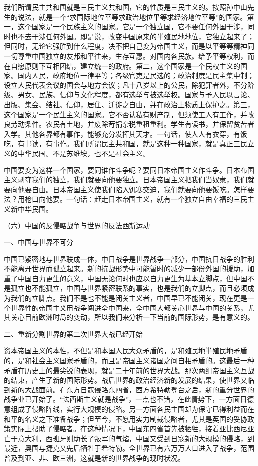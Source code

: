 我们所谓民主共和国就是三民主义共和国，它的性质是三民主义的。按照孙中山先生的说法，就是一个“求国际地位平等求政治地位平等求经济地位平等”的国家。第一，这个国家是一个民族主义的国家。它是一个独立国，它不要任何外国干涉，同时也不去干涉任何外国。即是说，改变中国原来的半殖民地地位，它独立起来了；但同时，无论它强胜到什么程度，决不把自己变为帝国主义，而是以平等等精神同一切尊重中国独立的友邦和平往来，生存互惠。对国内各民族。给予平等权利，而在自愿原则下互相团结，建立统一的政府。第二，这个国家是一个民权主义的国家。国内人民，政府地位一律平等；各级官吏是民选的；政治制度是民主集中制；设立人民代表会议的国会与地方会议；凡十八岁以上的公民，除犯罪者外，不分阶级、男女、民族、信仰与文化程度，都有选举与被选举权。国家与予人民以言论、出版、集会、结社、信仰，居住、迁徙之自由，并在政治上物质上保护之。第三，这个国家是一个民生主义的国家。它不否认私有财产制，但须使工人有工作，并改良劳动条件。农民有土地，并废除苛捐杂税重租重利。学生有读书，并保留贫苦者入学。其他各界都有事作，能够充分发挥其天才。一句话，使人人有衣穿，有饭吃，有书读，有事作。我们所谓民主共和国，就是这种一种国家，就是真正三民立义的中华民国。不是苏维埃，也不是社会主义。

中国要变为这样一个国家，要同谁作斗争呢？要同日本帝国主义作斗争。日本布国主义剥夺我们的独立，我们就要向他要独立。日本帝国主义把我们当奴隶，我们就要向他要自由。日本帝国主义使我们陷入饥寒交迫，我们就要向他要饭吃。怎样要法？用枪口向他要。一句话：赶走日本帝国主义，就有一个独立自由幸福的三民主义新中华民国。

（六）中国的反侵略战争与世界的反法西斯运动

一、中国与世界不可分

中国已紧密地与世界联成一体，中日战争是世界战争一部分，中国抗日战争的胜利不能离开世界而孤立起来。新的抗战形势中可能暂时的减少一部份外国的援助，加重了中国自力更生的意义，中国无论何时也应以自力更生为基本立脚点，但中国不是孤立也不能孤立，中国与世界紧密联系的事实，也是我们的立脚点，而且必须成为我们的立脚点。我们不是也不能是闭关主义者，中国早已不能闭关，现在更是一个世界性的帝国主义用战争闯进全中国来，全中国人都关心世界与中国的关系，尤其关心目前欧洲时局的变动，所以我们来分析一下当前的国际形势，是有意义的。

二、重新分割世界的第二次世界大战已经开始

资本帝国主义的本性，不但是和本国人民大众矛盾的，是和殖民地半殖民地矛盾的，是和社会主义国家矛盾的，而且是帝国主义诸国之间自相矛盾的。这最后一种矛盾在历史上的最尖锐的表现，就是二十年前的世界大战。那次两组帝国主义互战的结束，产生了新的国际形势。战后世界的政治经济新的发展的结果，使世界又临到新的大战面前。在东方日寇侵略东四省，西方希特勒登台之后，新的重分世界的战争业已开始了。“法西斯主义就是战争”，一点也不错，在此情势下，一方面日德意组成了侵略阵线，实行大规模的侵略。另一方面各民主国却为保守已得利益而在和平的名义之下准备战争；但至今，不愿用实力制裁侵略者，尤其是英国的妥协政策实际上帮助了侵略者。在这种情况下，中国东四省首先被牺牲，接着亚比西尼亚亡于意大利，西班牙则助长了叛军的气焰，中国又受到日寇新的大规模的侵略，到最近，奥国与捷克又先后牺牲于希特勒。全世界已有六万万人口进入了战争，范围普及到亚、非、欧三洲，这就是新的世界战争的现时状况。


